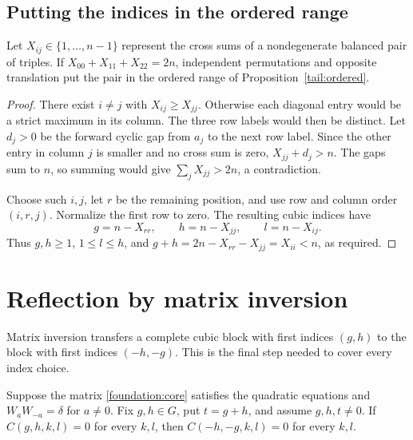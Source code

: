 \subsection{Putting the indices in the ordered range}

\begin{lemma}\label{tail:normalform}
Let $X_{ij}\in\{1,\ldots,n-1\}$ represent the cross sums of a
nondegenerate balanced pair of triples. If
$X_{00}+X_{11}+X_{22}=2n$, independent permutations and opposite
translation put the pair in the ordered range of
Proposition~\ref{tail:ordered}.
\end{lemma}

\begin{proof}
There exist $i\ne j$ with $X_{ij}\ge X_{jj}$.  Otherwise
each diagonal entry would be a strict maximum in its column.
The three row labels would then be distinct.  Let $d_j>0$
be the forward cyclic gap from $a_j$ to the next row label.
Since the other entry in column $j$ is smaller and no cross
sum is zero, $X_{jj}+d_j>n$.  The gaps sum to $n$, so summing
would give $\sum_jX_{jj}>2n$, a contradiction.

Choose such $i,j$, let $r$ be the remaining position, and use
row and column order $(i,r,j)$.  Normalize the first row to
zero.  The resulting cubic indices have
\[
 g=n-X_{rr},\qquad h=n-X_{jj},\qquad l=n-X_{ij}.
\]
Thus $g,h\ge1$, $1\le l\le h$, and
$g+h=2n-X_{rr}-X_{jj}=X_{ii}<n$, as required.
\end{proof}

\section{Reflection by matrix inversion}
\label{sec:reflection}

Matrix inversion transfers a complete cubic block with first indices
$(g,h)$ to the block with first indices $(-h,-g)$. This is the final
step needed to cover every index choice.

\begin{lemma}\label{allodd:reflection}
Suppose the matrix \eqref{foundation:core} satisfies the quadratic equations
and $W_aW_{-a}=\delta$ for $a\ne0$.  Fix $g,h\in G$, put $t=g+h$, and assume $g,h,t\ne0$.  If $C(g,h,k,l)=0$ for every $k,l$, then
$C(-h,-g,k,l)=0$ for every $k,l$.
\end{lemma}

